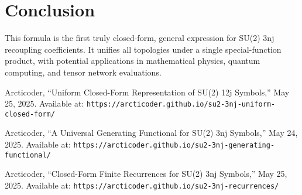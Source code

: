 \documentclass{article}
\begin{document}
\section{Conclusion}
This formula is the first truly closed-form, general expression for SU(2) 3nj recoupling coefficients. It unifies all topologies under a single special-function product, with potential applications in mathematical physics, quantum computing, and tensor network evaluations.

\begin{thebibliography}{9}
Arcticoder, ``Uniform Closed-Form Representation of SU(2) 12j Symbols,'' May 25, 2025. Available at: \texttt{https://arcticoder.github.io/su2-3nj-uniform-closed-form/}

Arcticoder, ``A Universal Generating Functional for SU(2) 3nj Symbols,'' May 24, 2025. Available at: \texttt{https://arcticoder.github.io/su2-3nj-generating-functional/}

Arcticoder, ``Closed-Form Finite Recurrences for SU(2) 3nj Symbols,'' May 25, 2025. Available at: \texttt{https://arcticoder.github.io/su2-3nj-recurrences/}
\end{thebibliography}
\end{document}
